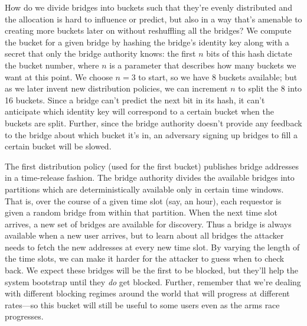 \documentclass{llncs}
\begin{document}
How do we divide bridges into buckets such that they're evenly distributed
and the allocation is hard to influence or predict, but also in a way
that's amenable to creating more buckets later on without reshuffling
all the bridges? We compute the bucket for a given bridge by hashing the
bridge's identity key along with a secret that only the bridge authority
knows: the first $n$ bits of this hash dictate the bucket number,
where $n$ is a parameter that describes how many buckets we want at this
point. We choose $n=3$ to start, so we have 8 buckets available; but as
we later invent new distribution policies, we can increment $n$ to split
the 8 into 16 buckets. Since a bridge can't predict the next bit in its
hash, it can't anticipate which identity key will correspond to a certain
bucket when the buckets are split. Further, since the bridge authority
doesn't provide any feedback to the bridge about which bucket it's in,
an adversary signing up bridges to fill a certain bucket will be slowed.


The first distribution policy (used for the first bucket) publishes bridge
addresses in a time-release fashion. The bridge authority divides the
available bridges into partitions which are deterministically available
only in certain time windows. That is, over the course of a given time
slot (say, an hour), each requestor is given a random bridge from within
that partition. When the next time slot arrives, a new set of bridges
are available for discovery. Thus a bridge is always available when a new
user arrives, but to learn about all bridges the attacker needs to fetch
the new addresses at every new time slot. By varying the length of the
time slots, we can make it harder for the attacker to guess when to check
back. We expect these bridges will be the first to be blocked, but they'll
help the system bootstrap until they \emph{do} get blocked. Further,
remember that we're dealing with different blocking regimes around the
world that will progress at different rates---so this bucket will still
be useful to some users even as the arms race progresses.
\end{document}
